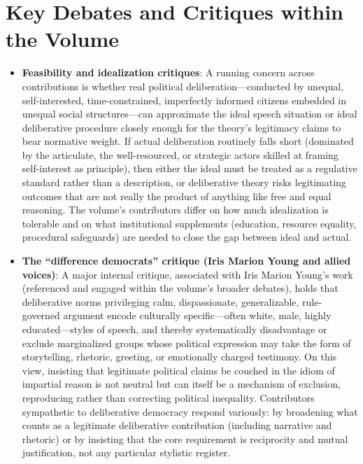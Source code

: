 \documentclass[12pt]{article}
\begin{document}
\section{Key Debates and Critiques within the Volume}

\begin{itemize}[leftmargin=*, itemsep=4pt]
    \item \textbf{Feasibility and idealization critiques}: A running concern across contributions is whether real political deliberation---conducted by unequal, self-interested, time-constrained, imperfectly informed citizens embedded in unequal social structures---can approximate the ideal speech situation or ideal deliberative procedure closely enough for the theory's legitimacy claims to bear normative weight. If actual deliberation routinely falls short (dominated by the articulate, the well-resourced, or strategic actors skilled at framing self-interest as principle), then either the ideal must be treated as a regulative standard rather than a description, or deliberative theory risks legitimating outcomes that are not really the product of anything like free and equal reasoning. The volume's contributors differ on how much idealization is tolerable and on what institutional supplements (education, resource equality, procedural safeguards) are needed to close the gap between ideal and actual.
    \item \textbf{The ``difference democrats'' critique (Iris Marion Young and allied voices)}: A major internal critique, associated with Iris Marion Young's work (referenced and engaged within the volume's broader debates), holds that deliberative norms privileging calm, dispassionate, generalizable, rule-governed argument encode culturally specific---often white, male, highly educated---styles of speech, and thereby systematically disadvantage or exclude marginalized groups whose political expression may take the form of storytelling, rhetoric, greeting, or emotionally charged testimony. On this view, insisting that legitimate political claims be couched in the idiom of impartial reason is not neutral but can itself be a mechanism of exclusion, reproducing rather than correcting political inequality. Contributors sympathetic to deliberative democracy respond variously: by broadening what counts as a legitimate deliberative contribution (including narrative and rhetoric) or by insisting that the core requirement is reciprocity and mutual justification, not any particular stylistic register.

\end{itemize}
\end{document}
